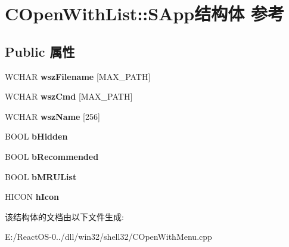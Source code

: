 \hypertarget{struct_c_open_with_list_1_1_s_app}{}\section{C\+Open\+With\+List\+:\+:S\+App结构体 参考}
\label{struct_c_open_with_list_1_1_s_app}
\subsection*{Public 属性}
\begin{DoxyCompactItemize}
\item 
\mbox{\label{struct_c_open_with_list_1_1_s_app_a0c2b95de6010e553dcf74a43ab9114d7}} 
W\+C\+H\+AR {\bfseries wsz\+Filename} \mbox{[}M\+A\+X\+\_\+\+P\+A\+TH\mbox{]}
\item 
\mbox{\label{struct_c_open_with_list_1_1_s_app_a3d03c068cbb08e28576607b41d87c6b0}} 
W\+C\+H\+AR {\bfseries wsz\+Cmd} \mbox{[}M\+A\+X\+\_\+\+P\+A\+TH\mbox{]}
\item 
\mbox{\label{struct_c_open_with_list_1_1_s_app_ae8eab3259d09a994e472fd8608476a2f}} 
W\+C\+H\+AR {\bfseries wsz\+Name} \mbox{[}256\mbox{]}
\item 
\mbox{\label{struct_c_open_with_list_1_1_s_app_a2631aabf875a038a796705568fee9359}} 
B\+O\+OL {\bfseries b\+Hidden}
\item 
\mbox{\label{struct_c_open_with_list_1_1_s_app_aeeee23bb842b39ec1cfd494fbff910a7}} 
B\+O\+OL {\bfseries b\+Recommended}
\item 
\mbox{\label{struct_c_open_with_list_1_1_s_app_a626fceef18d4cbdd2a3a1ba888a29183}} 
B\+O\+OL {\bfseries b\+M\+R\+U\+List}
\item 
\mbox{\label{struct_c_open_with_list_1_1_s_app_ac5667c25421f532b35a9ce1365af694b}} 
H\+I\+C\+ON {\bfseries h\+Icon}
\end{DoxyCompactItemize}


该结构体的文档由以下文件生成\+:\begin{DoxyCompactItemize}
\item 
E\+:/\+React\+O\+S-\/0../dll/win32/shell32/C\+Open\+With\+Menu.\+cpp\end{DoxyCompactItemize}

